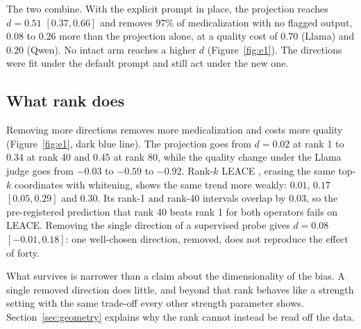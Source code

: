 The two combine. With the explicit prompt in place, the projection reaches $d{=}0.51$
$[0.37, 0.66]$ and removes $97\%$ of medicalization with no flagged output, $0.08$ to
$0.26$ more than the projection alone, at a quality cost of $0.70$ (Llama) and $0.20$
(Qwen). No intact arm reaches a higher $d$ (Figure~\ref{fig:e1}). The directions were fit
under the default prompt and still act under the new one.

\subsection{What rank does}
\label{sec:rank}

Removing more directions removes more medicalization and costs more quality
(Figure~\ref{fig:e1}, dark blue line). The projection goes from $d{=}0.02$ at rank 1 to
$0.34$ at rank 40 and $0.45$ at rank 80, while the quality change under the Llama judge
goes from $-0.03$ to $-0.59$ to $-0.92$. Rank-$k$ LEACE \citep{belrose2023leace}, erasing
the same top-$k$ coordinates with whitening, shows the same trend more weakly: $0.01$,
$0.17$ $[0.05, 0.29]$ and $0.30$. Its rank-1 and rank-40 intervals overlap by $0.03$, so
the pre-registered prediction that rank 40 beats rank 1 for both operators fails on
LEACE. Removing the single direction of a supervised probe gives $d{=}0.08$
$[-0.01, 0.18]$: one well-chosen direction, removed, does not reproduce the effect of
forty.

What survives is narrower than a claim about the dimensionality of the bias. A single
removed direction does little, and beyond that rank behaves like a strength setting with
the same trade-off every other strength parameter shows. Section~\ref{sec:geometry}
explains why the rank cannot instead be read off the data.
